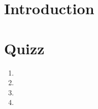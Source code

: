 \documentclass[ds]{sujet}
\begin{document}
\formation{} 
\matiere{}  
\auteur{} 
\def\SujetClsNumero{1}
\section*{Introduction}

\section{Quizz}
\begin{enumerate}
\item
\item
\item
\item
\end{enumerate}


\end{document}
